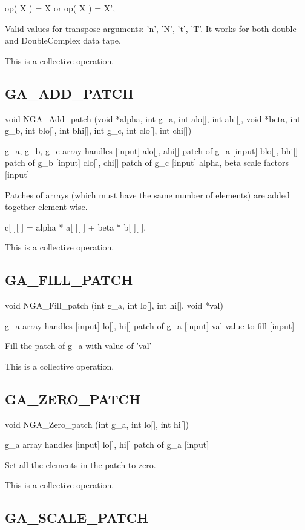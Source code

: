 op( X ) = X or op( X ) = X',

Valid values for transpose arguments: 'n', 'N', 't', 'T'. It works
for both double and DoubleComplex data tape.

This is a collective operation.


\subsection*{GA\_ADD\_PATCH}

void NGA\_Add\_patch (void {*}alpha, int g\_a, int alo{[}{]}, int
ahi{[}{]}, void {*}beta, int g\_b, int blo{[}{]}, int bhi{[}{]}, int
g\_c, int clo{[}{]}, int chi{[}{]})

g\_a, g\_b, g\_c array handles {[}input{]} alo{[}{]}, ahi{[}{]} patch
of g\_a {[}input{]} blo{[}{]}, bhi{[}{]} patch of g\_b {[}input{]}
clo{[}{]}, chi{[}{]} patch of g\_c {[}input{]} alpha, beta scale factors
{[}input{]}

Patches of arrays (which must have the same number of elements) are
added together element-wise.

c{[} {]}{[} {]} = alpha {*} a{[} {]}{[} {]} + beta {*} b{[} {]}{[}
{]}.

This is a collective operation. 


\subsection*{GA\_FILL\_PATCH}

void NGA\_Fill\_patch (int g\_a, int lo{[}{]}, int hi{[}{]}, void
{*}val)

g\_a array handles {[}input{]} lo{[}{]}, hi{[}{]} patch of g\_a {[}input{]}
val value to fill {[}input{]}

Fill the patch of g\_a with value of 'val'

This is a collective operation. 


\subsection*{GA\_ZERO\_PATCH}

void NGA\_Zero\_patch (int g\_a, int lo{[}{]}, int hi{[}{]})

g\_a array handles {[}input{]} lo{[}{]}, hi{[}{]} patch of g\_a {[}input{]}

Set all the elements in the patch to zero.

This is a collective operation.


\subsection*{GA\_SCALE\_PATCH}

